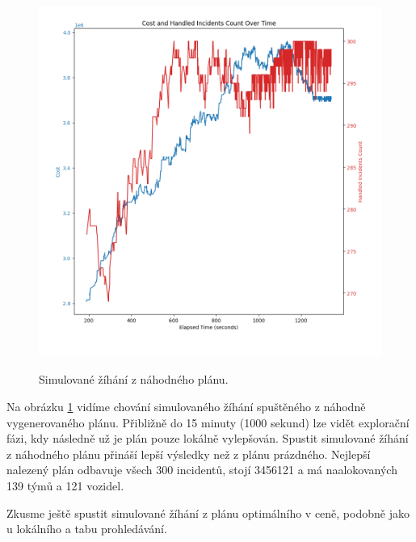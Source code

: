 \begin{figure}[H]
  \caption{Simulované žíhání z náhodného plánu.}
  \includegraphics[width=\textwidth]{img/sa_random_elapsed.png}
  \centering
  \label{img:sa_random}
\end{figure}

Na obrázku \ref{img:sa_random} vidíme chování simulovaného žíhání spuštěného z náhodně vygenerovaného plánu.
Přibližně do 15 minuty (1000 sekund) lze vidět explorační fázi, kdy následně už je plán pouze lokálně vylepšován. 
Spustit simulované žíhání z náhodného plánu přináší lepší výsledky než z plánu prázdného.
Nejlepší nalezený plán odbavuje všech 300 incidentů, stojí 3456121 a má naalokovaných 139 týmů a 121 vozidel.

Zkusme ještě spustit simulované žíhání z plánu optimálního v ceně, podobně jako u lokálního a tabu prohledávání.


